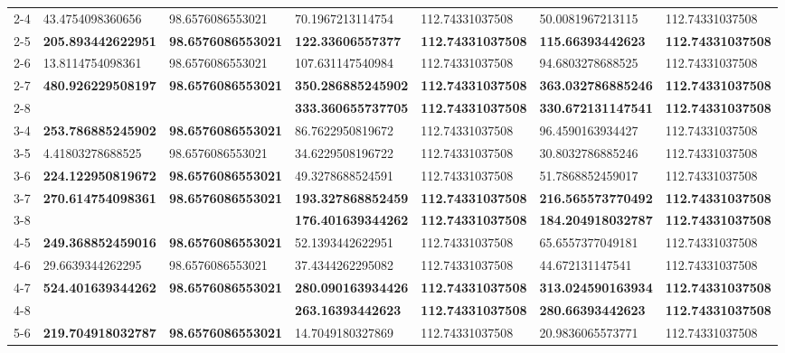 \begin{table}[ht]
\begin{tabular}{rllllll}
  2-4 & 43.4754098360656 & 98.6576086553021 & 70.1967213114754 & 112.74331037508 & 50.0081967213115 & 112.74331037508 \\ 
  2-5 & \textbf{205.893442622951} & \textbf{98.6576086553021} & \textbf{122.33606557377} & \textbf{112.74331037508} & \textbf{115.66393442623} & \textbf{112.74331037508} \\ 
  2-6 & 13.8114754098361 & 98.6576086553021 & 107.631147540984 & 112.74331037508 & 94.6803278688525 & 112.74331037508 \\ 
  2-7 & \textbf{480.926229508197} & \textbf{98.6576086553021} & \textbf{350.286885245902} & \textbf{112.74331037508} & \textbf{363.032786885246} & \textbf{112.74331037508} \\ 
  2-8 &  &  & \textbf{333.360655737705} & \textbf{112.74331037508} & \textbf{330.672131147541} & \textbf{112.74331037508} \\ 
  3-4 & \textbf{253.786885245902} & \textbf{98.6576086553021} & 86.7622950819672 & 112.74331037508 & 96.4590163934427 & 112.74331037508 \\ 
  3-5 & 4.41803278688525 & 98.6576086553021 & 34.6229508196722 & 112.74331037508 & 30.8032786885246 & 112.74331037508 \\ 
  3-6 & \textbf{224.122950819672} & \textbf{98.6576086553021} & 49.3278688524591 & 112.74331037508 & 51.7868852459017 & 112.74331037508 \\ 
  3-7 & \textbf{270.614754098361} & \textbf{98.6576086553021} & \textbf{193.327868852459} & \textbf{112.74331037508} & \textbf{216.565573770492} & \textbf{112.74331037508} \\ 
  3-8 &  &  & \textbf{176.401639344262} & \textbf{112.74331037508} & \textbf{184.204918032787} & \textbf{112.74331037508} \\ 
  4-5 & \textbf{249.368852459016} & \textbf{98.6576086553021} & 52.1393442622951 & 112.74331037508 & 65.6557377049181 & 112.74331037508 \\ 
  4-6 & 29.6639344262295 & 98.6576086553021 & 37.4344262295082 & 112.74331037508 & 44.672131147541 & 112.74331037508 \\ 
  4-7 & \textbf{524.401639344262} & \textbf{98.6576086553021} & \textbf{280.090163934426} & \textbf{112.74331037508} & \textbf{313.024590163934} & \textbf{112.74331037508} \\ 
  4-8 &  &  & \textbf{263.16393442623} & \textbf{112.74331037508} & \textbf{280.66393442623} & \textbf{112.74331037508} \\ 
  5-6 & \textbf{219.704918032787} & \textbf{98.6576086553021} & 14.7049180327869 & 112.74331037508 & 20.9836065573771 & 112.74331037508 \\ 

\end{tabular}
\end{table}
